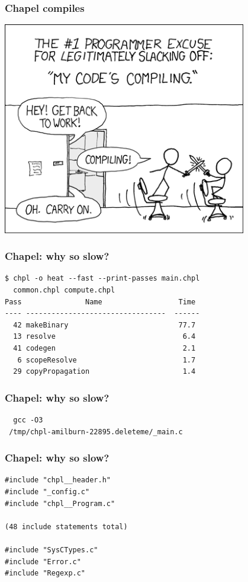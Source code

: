 \documentclass{beamer}
\begin{document}
\begin{frame}
 \frametitle{Chapel compiles}
 \includegraphics[width=0.8\textwidth]{xkcd.png}
\end{frame}

\begin{frame}[fragile]
 \frametitle{Chapel: why so slow?}
\begin{verbatim}
$ chpl -o heat --fast --print-passes main.chpl
  common.chpl compute.chpl
Pass               Name                  Time
---- ---------------------------------  ------
  42 makeBinary                          77.7
  13 resolve                              6.4
  41 codegen                              2.1
   6 scopeResolve                         1.7
  29 copyPropagation                      1.4
\end{verbatim}
\end{frame}

\begin{frame}[fragile]
 \frametitle{Chapel: why so slow?}
\begin{verbatim}
  gcc -O3
 /tmp/chpl-amilburn-22895.deleteme/_main.c
\end{verbatim}
\end{frame}

\begin{frame}[fragile]
 \frametitle{Chapel: why so slow?}
\begin{verbatim}
#include "chpl__header.h"
#include "_config.c"
#include "chpl__Program.c"

(48 include statements total)

#include "SysCTypes.c"
#include "Error.c"
#include "Regexp.c"
\end{verbatim}
\end{frame}
\end{document}
